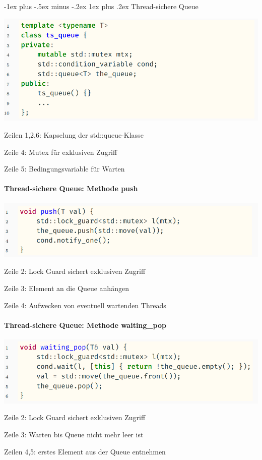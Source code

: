 \documentclass[10pt]{article}
\makeatletter
\renewcommand{\subsubsection}{\@startsection{subsubsection}{3}{0mm}%
                                {-1ex plus -.5ex minus -.2ex}%
                                {1ex plus .2ex}%
                                {\normalfont\small\bfseries}}
\makeatother
\begin{document}
\subsubsection{Thread-sichere Queue}
\begin{center}
  \includegraphics[width=0.4\linewidth]{Assets/Programmierparadigmen-code-snippet-37}
\end{center}
\begin{itemize*}
  \item Zeilen 1,2,6: Kapselung der std::queue-Klasse
  \item Zeile 4: Mutex für exklusiven Zugriff
  \item Zeile 5: Bedingungsvariable für Warten
\end{itemize*}

\paragraph{Thread-sichere Queue: Methode push}

\begin{center}
  \includegraphics[width=0.4\linewidth]{Assets/Programmierparadigmen-code-snippet-38}
\end{center}
\begin{itemize*}
  \item Zeile 2: Lock Guard sichert exklusiven Zugriff
  \item Zeile 3: Element an die Queue anhängen
  \item Zeile 4: Aufwecken von eventuell wartenden Threads
\end{itemize*}

\paragraph{Thread-sichere Queue: Methode waiting\_pop}

\begin{center}
  \includegraphics[width=0.4\linewidth]{Assets/Programmierparadigmen-code-snippet-39}
\end{center}
\begin{itemize*}
  \item Zeile 2: Lock Guard sichert exklusiven Zugriff
  \item Zeile 3: Warten bis Queue nicht mehr leer ist
  \item Zeilen 4,5: erstes Element aus der Queue entnehmen
\end{itemize*}
\end{document}
